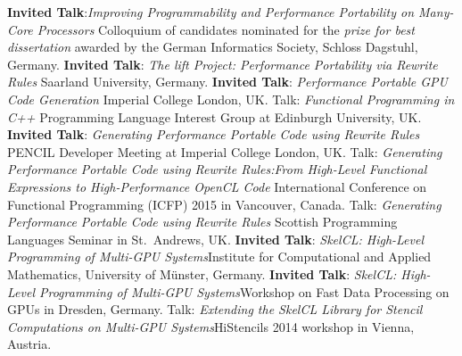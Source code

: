 \documentclass[11pt,a4paper]{moderncv}
\newcommand{\strong}[1]{\textcolor{color1}{\textbf{#1}}}
\begin{document}
         {\strong{Invited Talk}:\newline \emph{Improving Programmability and Performance Portability on Many-Core Processors}\newline
         \small Colloquium of candidates nominated for the \emph{prize for best dissertation} awarded by the German Informatics Society, Schloss Dagstuhl, Germany.}
         {\strong{Invited Talk}: \emph{The lift Project: Performance Portability via Rewrite Rules}\newline
          \small Saarland University, Germany.}
         {\strong{Invited Talk}: \emph{Performance Portable GPU Code Generation}\newline
         \small Imperial College London, UK.}
         {Talk: \emph{Functional Programming in C++}\newline
         \small Programming Language Interest Group at Edinburgh University, UK.}
         {\strong{Invited Talk}: \emph{Generating Performance Portable Code using Rewrite Rules}\newline
         \small PENCIL Developer Meeting at Imperial College London, UK.}
         {Talk: \emph{Generating Performance Portable Code using Rewrite Rules:\newline From High-Level Functional Expressions to High-Performance OpenCL Code}\newline
         \small International Conference on Functional Programming (ICFP) 2015 in Vancouver, Canada.}
         {Talk: \emph{Generating Performance Portable Code using Rewrite Rules}\newline
         \small Scottish Programming Languages Seminar in St.\ Andrews, UK.}
         {\strong{Invited Talk}: \emph{SkelCL\@: High-Level Programming of Multi-GPU
          Systems}\newline \small Institute for Computational and Applied
          Mathematics, University of Münster, Germany.}
         {\strong{Invited Talk}: \emph{SkelCL\@: High-Level Programming of Multi-GPU
          Systems}\newline \small Workshop on Fast Data Processing on GPUs in
          Dresden, Germany.}
         {Talk: \emph{Extending the SkelCL Library for Stencil
          Computations on Multi-GPU Systems}\newline \small HiStencils 2014
          workshop in Vienna, Austria.}
\end{document}

